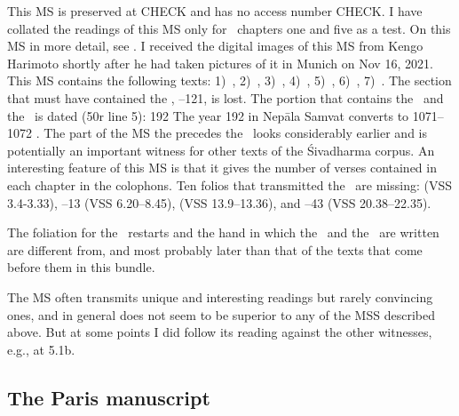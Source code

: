 This MS is preserved at CHECK and has no access number CHECK.
I have collated the readings of this MS only for \VSS\ 
chapters one and five as a test.
On this MS in more detail, see .
I received the digital images of this MS from Kengo Harimoto
shortly after he had taken pictures of it in Munich on  Nov 16, 2021. 
This MS contains the following texts:
1)~\SDhS, 
2)~\SDhU, 
3)~\Ums,
4)~\SivaUp,
5)~\Vss, 
6)~\Uums,
7)~\DharmP.
The section that must have contained the \SDhSangr, --121, is lost. 
The portion that contains the \VSS\ and the \DharmP\
is dated (\fol50r line 5):  192  The year 192 in Nepāla Samvat converts to 
1071--1072 \CE. The part of the MS the precedes the \VSS\ looks
considerably earlier and is potentially an important witness for
other texts of the Śivadharma corpus. An interesting 
feature of this MS is that it gives the number of verses contained in
each chapter in the colophons. Ten folios that transmitted the \VSS\
are missing: 
\fol5 (VSS 3.4-3.33),
\fols11--13 (VSS 6.20--8.45),
\fols24 (VSS 13.9--13.36), and
\fols39--43 (VSS 20.38--22.35). 

The foliation for the \VSS\ restarts
and the hand in which the \VSS\ and the \DharmP\ are written are different from, and
most probably later than that of the texts that come 
before them in this bundle. 

The MS often transmits unique and interesting readings
but rarely convincing ones, and in general does not seem to be superior 
to any of the MSS described above. But at some points
I did follow its reading against the other witnesses, e.g., at 5.1b.


\medskip
\subsection{The Paris manuscript}

